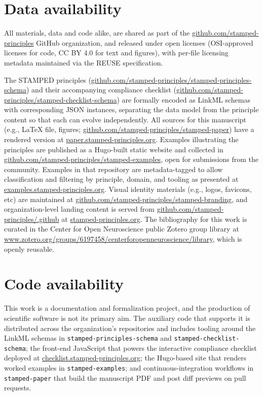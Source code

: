 \documentclass{article}
\makeatletter
\newcommand{\hyanchor}[1]{\texorpdfstring{\Hy@raisedlink{\hypertarget{#1}{}}}{}}
\newcommand{\httpsurl}[1]{\href{https://#1}{#1}}
\newcommand{\ghurl}[1]{\httpsurl{github.com/#1}}
\newcommand{\anchoredsection}[2]{\section[#2]{\hyanchor{#1}#2}}
\makeatother
\begin{document}
\anchoredsection{data-availability}{Data availability}

All materials, data and code alike, are shared as part of the \ghurl{stamped-principles} GitHub organization, and released under open licenses (OSI-approved licenses for code, CC BY 4.0 for text and figures), with per-file licensing metadata maintained via the REUSE specification.

The STAMPED principles\cite{cody_baker_stamped-principlesstamped-principles-schema_2026} (\ghurl{stamped-principles/stamped-principles-schema}) and their accompanying compliance checklist\cite{cody_baker_stamped-principlesstamped-checklist-schema_2026} (\ghurl{stamped-principles/stamped-checklist-schema}) are formally encoded as LinkML schemas with corresponding JSON instances, separating the data model from the principle content so that each can evolve independently.
All sources for this manuscript (e.g., LaTeX file, figures; \ghurl{stamped-principles/stamped-paper}) have a rendered version at \httpsurl{paper.stamped-principles.org}.
Examples illustrating the principles are published as a Hugo-built static website and collected in \ghurl{stamped-principles/stamped-examples}, open for submissions from the community.
Examples in that repository are metadata-tagged to allow classification and filtering by principle, domain, and tooling as presented at \httpsurl{examples.stamped-principles.org}.
Visual identity materials (e.g., logos, favicons, etc) are maintained at \ghurl{stamped-principles/stamped-branding}, and organization-level landing content is served from \ghurl{stamped-principles/.github} at \httpsurl{stamped-principles.org}.
The bibliography for this work is curated in the Center for Open Neuroscience public Zotero group library at \httpsurl{www.zotero.org/groups/6197458/centerforopenneuroscience/library}, which is openly reusable.

\anchoredsection{code-availability}{Code availability}

This work is a documentation and formalization project, and the production of scientific software is not its primary aim.
The auxiliary code that supports it is distributed across the organization's repositories and includes tooling around the LinkML schemas in \texttt{stamped-principles-schema} and \texttt{stamped-checklist-schema}; the front-end JavaScript that powers the interactive compliance checklist deployed at \httpsurl{checklist.stamped-principles.org}; the Hugo-based site that renders worked examples in \texttt{stamped-examples}; and continuous-integration workflows in \texttt{stamped-paper} that build the manuscript PDF and post diff previews on pull requests.
\end{document}
